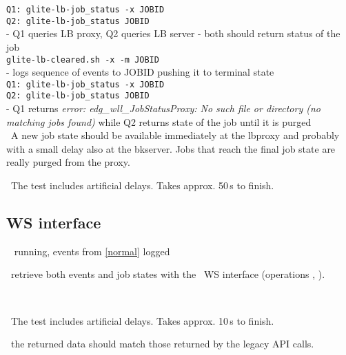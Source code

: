 {\tt Q1: glite-lb-job\_status -x JOBID } \\
{\tt Q2: glite-lb-job\_status JOBID } \\
- Q1 queries LB proxy, Q2 queries LB server - both should return status of the job \\

{\tt glite-lb-cleared.sh -x -m JOBID} \\
- logs sequence of events to JOBID pushing it to terminal state \\

{\tt Q1: glite-lb-job\_status -x JOBID } \\
{\tt Q2: glite-lb-job\_status JOBID } \\
- Q1 returns {\em error: edg\_wll\_JobStatusProxy: No such file or directory (no matching jobs found)} while Q2 returns state of the job until it is purged \\

\result\ A new job state should be available immediately at the
lbproxy and probably with a small delay also at the bkserver. Jobs that reach the final job state
are really purged from the proxy.

\note\ The test includes artificial delays. Takes approx. 50\,s to finish.


\subsection{WS interface}
\req\  running, events from \ref{normal} logged

\what\ retrieve both events and job states with the \LB\ WS interface
(operations , ).

\how\ 

\note\ The test includes artificial delays. Takes approx. 10\,s to finish.

\result\ the returned data should match those returned by the legacy API calls.











